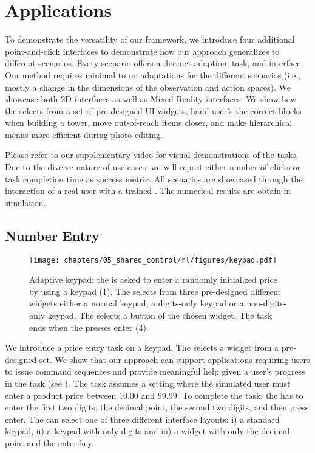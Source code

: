 \section{Applications}
To demonstrate the versatility of our framework, we introduce four additional point-and-click interfaces to demonstrate how our approach generalizes to different scenarios. Every scenario offers a distinct adaption, task, and interface. Our method requires minimal to no adaptations for the different scenarios (i.e., mostly a change in the dimensions of the observation and action spaces). We showcase both 2D interfaces as well as Mixed Reality interfaces. We show how the \interfaceagent selects from a set of pre-designed UI widgets, hand user's the correct blocks when building a tower, move out-of-reach items closer, and make hierarchical menus more efficient during photo editing. 

Please refer to our supplementary video for visual demonstrations of the tasks. Due to the diverse nature of use cases, we will report either number of clicks or task completion time as success metric. All scenarios are showcased through the interaction of a real user with a trained \interfaceagent. The numerical results are obtain in simulation.

\subsection{Number Entry}
\label{sec:number}
\begin{figure}[!t]
    \centering
    \texttt{[image: chapters/05\_shared\_control/rl/figures/keypad.pdf]}
    \caption{Adaptive keypad: the \useragent is asked to enter a randomly initialized price by using a keypad (1). The \interfaceagent selects from three pre-designed different widgets either a normal keypad,  a digits-only keypad or a non-digits-only keypad. The \useragent selects a button of the chosen widget. The task ends when the \useragent presses enter (4).}
    \label{fig:price}
\end{figure}

We introduce a price entry task on a keypad. The \interfaceagent selects a widget from a pre-designed set. We show that our approach can support applications requiring users to issue command sequences and provide meaningful help given a user's progress in the task (see ). 
The task assumes a setting where the simulated user must enter a product price between $10.00$ and $99.99$.
To complete the task, the \useragent has to enter the first two digits, the decimal point, the second two digits, and then press enter. 
The \interfaceagent can select one of three different interface layouts: i) a standard keypad, ii) a keypad with only digits and iii) a widget with only the decimal point and the enter key. 

